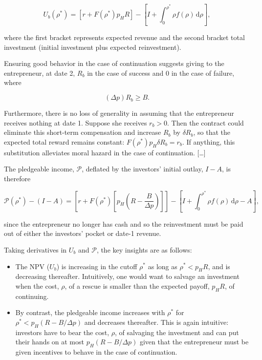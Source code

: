\documentclass[11pt,a4paper]{article}
\providecommand{\tightlist}{\setlength{\itemsep}{0pt}\setlength{\parskip}{0pt}}
\begin{document}
\[U_b(\rho^*) = [r + F(\rho^*)p_HR] - \left[I + \int_0^{\rho^*}\rho f(\rho)\,\mathrm{d}\rho\right],\]

where the first bracket represents expected revenue and the second bracket total investment (initial
investment plus expected reinvestment).

Ensuring good behavior in the case of continuation suggests giving to the entrepreneur, at date 2,
\(R_b\) in the case of success and 0 in the case of failure, where

\[(\Delta p)R_b \geqslant B.\]

Furthermore, there is no loss of generality in assuming that the entrepreneur receives nothing at
date 1. Suppose she receives \(r_b > 0\). Then the contract could eliminate this short-term
compensation and increase \(R_b\) by \(\delta R_b\), so that the expected total reward remains
constant: \(F(\rho^*)p_H\delta R_b = r_b\). If anything, this substitution alleviates moral hazard
in the case of continuation. {[}\ldots{]}

The pledgeable income, \(\mathcal{P}\), deflated by the investors' initial outlay, \(I - A\), is
therefore

\[\mathcal{P}(\rho^*) - (I - A) = \left[r + F(\rho^*)\left[p_H\left(R - \frac{B}{\Delta p}\right)\right]\right] - \left[I + \int_0^{\rho^*}\rho f(\rho)\,\mathrm{d}\rho - A\right],\]

since the entrepreneur no longer has cash and so the reinvestment must be paid out of either the
investors' pocket or date-1 revenue.

Taking derivatives in \(U_b\) and \(\mathcal{P}\), the key insights are as follows:

\begin{itemize}
\tightlist
\item
  The NPV (\(U_b\)) is increasing in the cutoff \(\rho^*\) as long as \(\rho^* < p_HR\), and is
  decreasing thereafter. Intuitively, one would want to salvage an investment when the cost,
  \(\rho\), of a rescue is smaller than the expected payoff, \(p_HR\), of continuing.
\item
  By contrast, the pledgeable income increases with \(\rho^*\) for \(\rho^* < p_H(R - B/\Delta p)\)
  and decreases thereafter. This is again intuitive: investors have to bear the cost, \(\rho\), of
  salvaging the investment and can put their hands on at most \(p_H(R - B/\Delta p)\) given that the
  entrepreneur must be given incentives to behave in the case of continuation.
\end{itemize}
\end{document}

